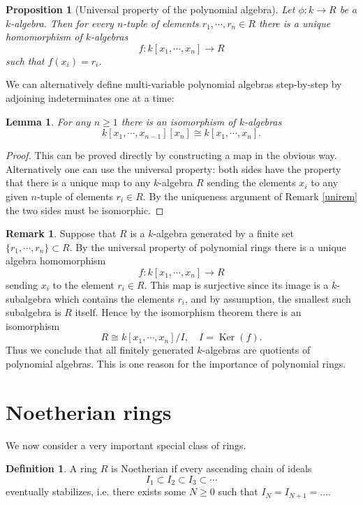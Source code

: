\documentclass [12pt,oneside,a4paper,mathscr]{amsart}
\newtheorem{prop}[thm]{Proposition}
\newtheorem{lemma}[thm]{Lemma}
\theoremstyle{definition}
\newtheorem{defn}[thm]{Definition}
\newtheorem{remark}[thm]{Remark}
\renewcommand{\geq}{\geqslant}
\newcommand{\isom}{\cong}
\renewcommand{\ker}{\operatorname{Ker}}
\begin{document}
\begin{prop}[Universal property of the polynomial algebra]
Let $\phi\colon k\to R$ be a $k$-algebra. Then for every $n$-tuple of elements $r_1,\cdots, r_n\in R$ there is a unique homomorphism of $k$-algebras \[f\colon k[x_1,\cdots,x_n]\to R\] such that $f(x_i)=r_i$.
\end{prop}

We can alternatively define multi-variable polynomial algebras step-by-step by adjoining indeterminates one at a time:

\begin{lemma}
\label{boot}
For any $n\geq 1$ there is an isomorphism of $k$-algebras
\[k[x_1,\cdots,x_{n-1}] [x_n]\isom k[x_1,\cdots,x_n].\]
\end{lemma}

\begin{proof}
 This can be proved directly by constructing a map in the obvious way. Alternatively one can use the universal property: both sides have the property that there is a unique map to any $k$-algebra $R$ sending the elements $x_i$ to any given $n$-tuple of elements $r_i\in R$. By the uniqueness argument of Remark \ref{unirem} the two sides must be isomorphic. 
\end{proof}


\begin{remark}
\label{remm}
Suppose that $R$ is a $k$-algebra generated by a finite set $\{r_1,\cdots,r_n\}\subset R$.  By the universal property of polynomial rings there is a unique algebra homomorphism
\[f\colon k[x_1,\cdots, x_n]\to R\]
sending $x_i$ to the element $r_i\in R$.
This map is surjective since its image is a $k$-subalgebra which contains the elements $r_i$, and by assumption,  the smallest such subalgebra is $R$ itself. Hence by the  isomorphism theorem there is an isomorphism
\[R\isom k[x_1,\cdots, x_n]/I, \quad I=\ker (f).\]
Thus we conclude that all finitely generated $k$-algebras are quotients of polynomial algebras. This is one reason for the importance of polynomial rings.
\end{remark}



\section{Noetherian rings}

We now consider a very important special class of rings.


\begin{defn}
A ring $R$ is Noetherian if every ascending chain of ideals
\[I_1\subset I_2 \subset I_3 \subset \cdots \]
eventually stabilizes, i.e. there exists some $N\geq 0$ such that $I_N=I_{N+1}= ...$.
\end{defn}
\end{document}
